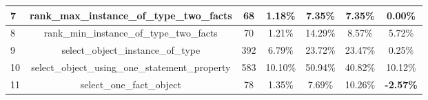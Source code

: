 \begin{table}[h!]
{\begin{tabular}{|l|c|cc|cc|c|}
    7                            & rank\_max\_instance\_of\_type\_two\_facts                                                                              & 68                                                  & 1.18\%                                                                          & 7.35\%                                                                                                 & 7.35\%                                                                                 & 0.00\%                                  \\ \hline
    8                            & rank\_min\_instance\_of\_type\_two\_facts                                                                              & 70                                                  & 1.21\%                                                                          & 14.29\%                                                                                                & 8.57\%                                                                                 & 5.72\%                                  \\ \hline
    9                            & select\_object\_instance\_of\_type                                                                                     & 392                                                 & 6.79\%                                                                          & 23.72\%                                                                                                & 23.47\%                                                                                & 0.25\%                                  \\ \hline
    10                           & select\_object\_using\_one\_statement\_property                                                                        & 583                                                 & 10.10\%                                                                         & 50.94\%                                                                                                & 40.82\%                                                                                & 10.12\%                                 \\ \hline
    11                           & select\_one\_fact\_object                                                                                              & 78                                                  & 1.35\%                                                                          & 7.69\%                                                                                                 & 10.26\%                                                                                & \textbf{-2.57\%}                        \\ \hline

\end{tabular}}
\end{table}
